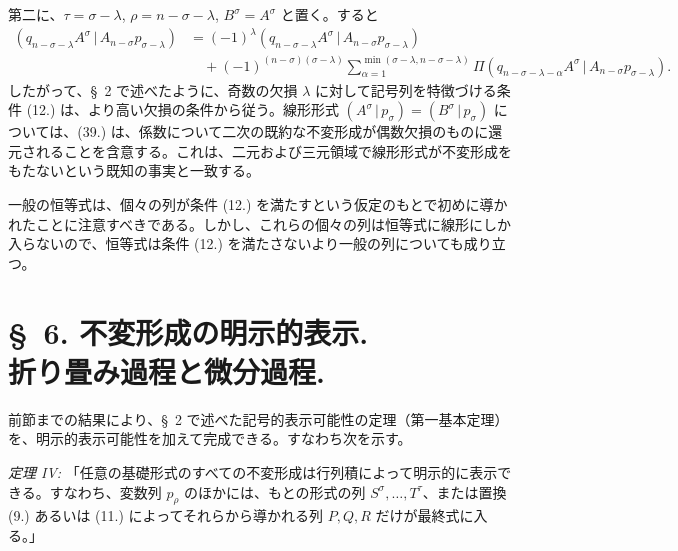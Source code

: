\documentclass[11pt]{article}
\newcommand{\pair}[2]{(#1\,|\,#2)}
\begin{document}
第二に、$\tau=\sigma-\lambda$, $\rho=n-\sigma-\lambda$, $B^\sigma=A^\sigma$ と置く。すると
\begin{equation}
\begin{aligned}
\pair{q_{n-\sigma-\lambda}A^\sigma}{A_{n-\sigma}p_{\sigma-\lambda}}
&=(-1)^\lambda\pair{q_{n-\sigma-\lambda}A^\sigma}{A_{n-\sigma}p_{\sigma-\lambda}}\\
&\quad+(-1)^{(n-\sigma)(\sigma-\lambda)}
 \sum_{\alpha=1}^{\min(\sigma-\lambda,n-\sigma-\lambda)}
 \Pi\pair{q_{n-\sigma-\lambda-\alpha}A^\sigma}{A_{n-\sigma}p_{\sigma-\lambda}}.
\end{aligned}
\tag{39}
\end{equation}
したがって、\S\ 2 で述べたように、奇数の欠損 $\lambda$ に対して記号列を特徴づける条件 (12.) は、より高い欠損の条件から従う。線形形式 $\pair{A^\sigma}{p_\sigma}=\pair{B^\sigma}{p_\sigma}$ については、(39.) は、係数について二次の既約な不変形成が偶数欠損のものに還元されることを含意する。これは、二元および三元領域で線形形式が不変形成をもたないという既知の事実と一致する。

一般の恒等式は、個々の列が条件 (12.) を満たすという仮定のもとで初めに導かれたことに注意すべきである。しかし、これらの個々の列は恒等式に線形にしか入らないので、恒等式は条件 (12.) を満たさないより一般の列についても成り立つ。

\section*{\S\ 6. 不変形成の明示的表示.\\折り畳み過程と微分過程.}
前節までの結果により、\S\ 2 で述べた記号的表示可能性の定理（第一基本定理）を、明示的表示可能性を加えて完成できる。すなわち次を示す。

\emph{定理 IV:} 「任意の基礎形式のすべての不変形成は行列積によって明示的に表示できる。すなわち、変数列 $p_\rho$ のほかには、もとの形式の列 $S^\sigma,\ldots,T^\tau$、または置換 (9.) あるいは (11.) によってそれらから導かれる列 $P,Q,R$ だけが最終式に入る。」
\end{document}

